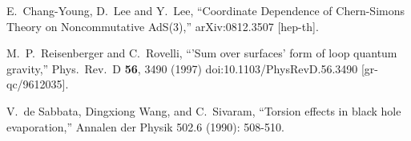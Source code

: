 \documentclass[11pt]{article}
\numberwithin{equation}{section}
\begin{document}
\begin{thebibliography}{99}
  E.~Chang-Young, D.~Lee and Y.~Lee,
  ``Coordinate Dependence of Chern-Simons Theory on Noncommutative AdS(3),''
  arXiv:0812.3507 [hep-th].







  M.~P.~Reisenberger and C.~Rovelli,
  ``'Sum over surfaces' form of loop quantum gravity,''
  Phys.\ Rev.\ D {\bf 56}, 3490 (1997)
  doi:10.1103/PhysRevD.56.3490
  [gr-qc/9612035].
 
V.~de Sabbata, Dingxiong Wang, and C.~Sivaram, ``Torsion effects in black hole evaporation,''
Annalen der Physik 502.6 (1990): 508-510.

  

\end{thebibliography}
\end{document}
